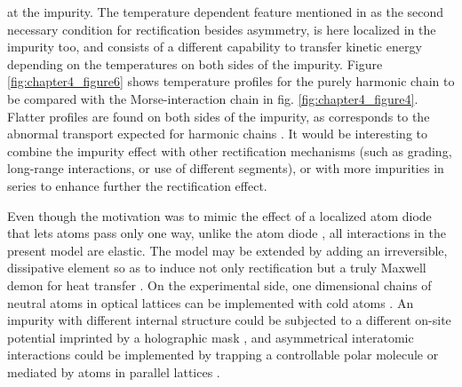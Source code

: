 at the impurity.
The temperature dependent feature mentioned in \cite{Pereira2017} as the second necessary condition for rectification besides asymmetry, is here localized in the impurity too, and consists of a different
capability to transfer kinetic energy depending on the temperatures on both sides of the impurity.
Figure \ref{fig:chapter4_figure6} shows temperature profiles for the purely harmonic chain to be compared with the Morse-interaction
chain in fig. \ref{fig:chapter4_figure4}. Flatter profiles are found on both sides of the impurity, as corresponds to the abnormal transport expected for harmonic chains \cite{Lepri2003}. It would be interesting to combine the impurity effect with other rectification mechanisms (such as grading, long-range interactions, or use of different segments), or with more impurities in series to enhance further the rectification effect.

Even though the motivation was to mimic the effect of a localized atom diode that lets atoms pass only one way,
unlike the atom diode \cite{Ruschhaupt2004}, all interactions in the present model
are elastic. The model may be extended by adding an irreversible,  dissipative element so as to induce not only rectification but a truly Maxwell demon for heat transfer \cite{Skordos1992,Ruschhaupt2006}.
On the experimental side, one dimensional chains of neutral atoms in optical lattices can be implemented with cold atoms \cite{Bloch2005}.
An impurity with different internal structure could be subjected to a different on-site potential imprinted by a holographic mask \cite{Bakr2009}, and asymmetrical interatomic interactions could be implemented by trapping a controllable polar molecule or mediated by atoms in parallel lattices \cite{Gollub2014}.

